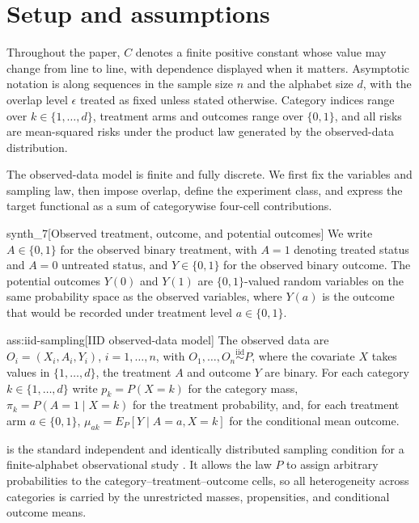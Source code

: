 \documentclass[11pt]{article}
\begin{document}
\section{Setup and assumptions}

Throughout the paper, \(C\) denotes a finite positive constant whose value may change from line to line, with dependence displayed when it matters. Asymptotic notation is along sequences in the sample size \(n\) and the alphabet size \(d\), with the overlap level \(\epsilon\) treated as fixed unless stated otherwise. Category indices range over \(k\in\{1,\ldots,d\}\), treatment arms and outcomes range over \(\{0,1\}\), and all risks are mean-squared risks under the product law generated by the observed-data distribution.

The observed-data model is finite and fully discrete. We first fix the variables and sampling law, then impose overlap, define the experiment class, and express the target functional as a sum of categorywise four-cell contributions.

\begin{definitionv}{synth_7}[Observed treatment, outcome, and potential outcomes]
We write \(A\in\{0,1\}\) for the observed binary treatment, with \(A=1\) denoting treated status and \(A=0\) untreated status, and \(Y\in\{0,1\}\) for the observed binary outcome. The potential outcomes \(Y(0)\) and \(Y(1)\) are \(\{0,1\}\)-valued random variables on the same probability space as the observed variables, where \(Y(a)\) is the outcome that would be recorded under treatment level \(a\in\{0,1\}\).
\end{definitionv}

\begin{assumptionv}{ass:iid-sampling}[IID observed-data model]
The observed data are \(O_i=(X_i,A_i,Y_i)\), \(i=1,\ldots,n\), with \(O_1,\ldots,O_n\stackrel{\mathrm{iid}}{\sim}P\), where the covariate \(X\) takes values in \(\{1,\ldots,d\}\), the treatment \(A\) and outcome \(Y\) are binary. For each category \(k\in\{1,\ldots,d\}\) write \(p_k=P(X=k)\) for the category mass, \(\pi_k=P(A=1\mid X=k)\) for the treatment probability, and, for each treatment arm \(a\in\{0,1\}\), \(\mu_{ak}=E_P[Y\mid A=a,X=k]\) for the conditional mean outcome.
\end{assumptionv}

 is the standard independent and identically distributed sampling condition for a finite-alphabet observational study \citep{ZengBalakrishnanHanKennedy2024}. It allows the law \(P\) to assign arbitrary probabilities to the category--treatment--outcome cells, so all heterogeneity across categories is carried by the unrestricted masses, propensities, and conditional outcome means.
\end{document}
